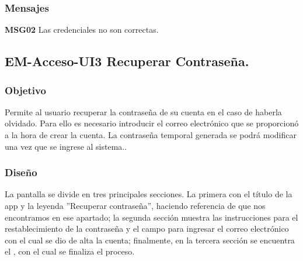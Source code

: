 \subsubsection{Mensajes}
	
	\begin{Citemize}
		\item {\bf MSG02} Las credenciales no son correctas.
	\end{Citemize}





\subsection{EM-Acceso-UI3 Recuperar Contraseña.}

\subsubsection{Objetivo}
	\noindent
	Permite al usuario recuperar la contraseña de su cuenta en el caso de haberla olvidado. Para ello
	es necesario introducir el correo electrónico que se proporcionó a la hora de crear la cuenta. 
	La contraseña temporal generada se podrá modificar una vez que se ingrese al sistema..

\subsubsection{Diseño}
	\noindent
	La pantalla se divide en tres principales secciones. La primera con el título de la app y la
	leyenda ''Recuperar contraseña'', haciendo referencia de que nos encontramos en ese apartado; la
	segunda sección muestra las instrucciones para el restablecimiento de la contraseña y el campo
	para ingresar el correo electrónico con el cual se dio de alta la cuenta; finalmente, en la tercera
	sección se encuentra el , con el cual se finaliza el proceso.

\pagebreak
{}

